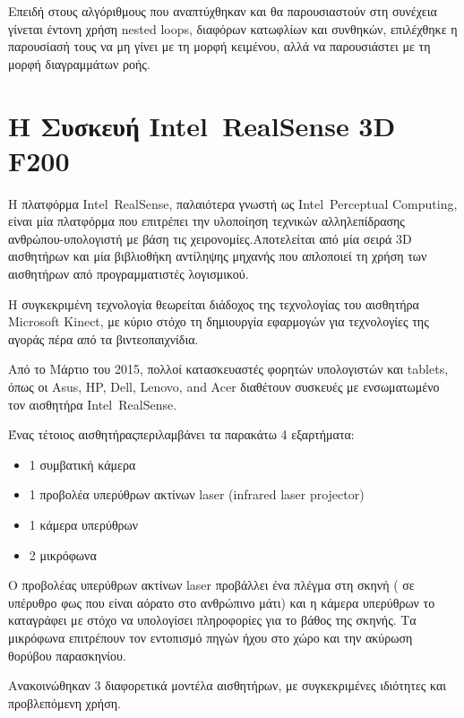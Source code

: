 Επειδή στους αλγόριθμους που αναπτύχθηκαν και θα παρουσιαστούν στη συνέχεια γίνεται έντονη χρήση nested loops, διαφόρων κατωφλίων και συνθηκών, επιλέχθηκε η παρουσίασή τους να μη γίνει με τη μορφή κειμένου, αλλά να παρουσιάστει με τη μορφή διαγραμμάτων ροής.




\section{Η Συσκευή Intel\textregistered\ RealSense\texttrademark{} 3D F200 }


Η πλατφόρμα Intel\textregistered\ RealSense\texttrademark{}, παλαιότερα γνωστή ως Intel\textregistered\ Perceptual Computing, είναι μία πλατφόρμα που επιτρέπει την υλοποίηση τεχνικών αλληλεπίδρασης ανθρώπου-υπολογιστή με βάση τις χειρονομίες.Αποτελείται από μία σειρά 3D αισθητήρων και μία βιβλιοθήκη αντίληψης μηχανής που απλοποιεί τη χρήση των αισθητήρων από προγραμματιστές λογισμικού. \cite{RealsenseCamera}

Η συγκεκριμένη τεχνολογία θεωρείται διάδοχος της τεχνολογίας του αισθητήρα Microsoft Kinect, με κύριο στόχο τη δημιουργία εφαρμογών για τεχνολογίες της αγοράς πέρα από τα βιντεοπαιχνίδια.

Από το Μάρτιο του 2015, πολλοί κατασκευαστές φορητών υπολογιστών και tablets\cite{Realsenselaptops}, όπως οι Asus, HP, Dell, Lenovo, and Acer διαθέτουν συσκευές με ενσωματωμένο τον αισθητήρα Intel\textregistered\ RealSense\texttrademark{}. 

Ένας τέτοιος αισθητήραςπεριλαμβάνει τα παρακάτω 4 εξαρτήματα: 


\begin{itemize}
  \item 1 συμβατική κάμερα
  \item 1 προβολέα υπερύθρων ακτίνων laser (infrared laser projector)
  \item 1 κάμερα υπερύθρων
  \item 2 μικρόφωνα
\end{itemize}



Ο προβολέας υπερύθρων ακτίνων laser προβάλλει ένα πλέγμα στη σκηνή ( σε υπέρυθρο φως που είναι αόρατο στο ανθρώπινο μάτι) και η κάμερα υπερύθρων το καταγράφει με στόχο να υπολογίσει πληροφορίες για το βάθος της σκηνής.
Τα μικρόφωνα επιτρέπουν τον εντοπισμό πηγών ήχου στο χώρο και την ακύρωση θορύβου παρασκηνίου.


Ανακοινώθηκαν 3 διαφορετικά μοντέλα αισθητήρων, με συγκεκριμένες ιδιότητες και προβλεπόμενη χρήση. 

